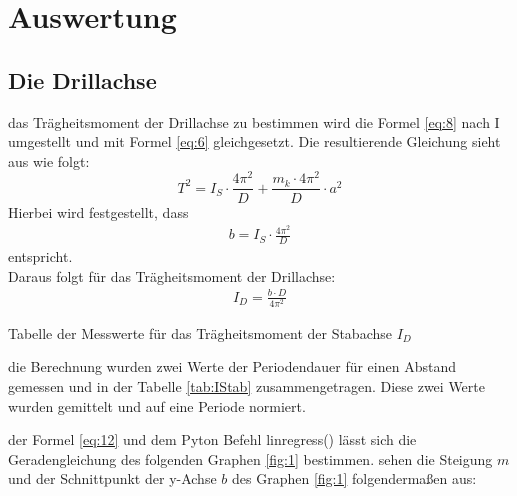 \section{Auswertung}\justifying

\subsection{Die Drillachse}\justifying %

\justifying das Trägheitsmoment der Drillachse zu bestimmen wird die Formel \eqref{eq:8} nach I umgestellt und mit Formel %
\eqref{eq:6} gleichgesetzt. Die resultierende Gleichung sieht aus wie folgt:
\begin{equation}
T^2 = I_S \cdot \frac{4\pi^2}{D} + \frac{m_k \cdot 4\pi^2}{D} \cdot a^2\label{eq:11}
\end{equation} 
Hierbei wird festgestellt, dass
\begin{align}
    b=I_S \cdot \frac{4\pi^2}{D} \label{eq:12}
\end{align}
entspricht.\\
Daraus folgt für das Trägheitsmoment der Drillachse:
\begin{align}
    I_D = \frac{b \cdot D}{4 \pi^2} \label{eq:13}
\end{align}

\begin{table}[H]
    \centering
    
    \caption{Tabelle der Messwerte für das Trägheitsmoment der Stabachse $I_D$}
    \label{tab:IStab}
\end{table}

 die Berechnung wurden zwei Werte der Periodendauer für einen Abstand gemessen und in der Tabelle \ref{tab:IStab}
zusammengetragen. Diese zwei Werte wurden gemittelt und auf eine Periode normiert.

\justifying der Formel \eqref{eq:12} und dem Pyton Befehl linregress() \cite{numpy} lässt sich die Geradengleichung
des folgenden Graphen \ref{fig:1} bestimmen. 
\justifying sehen die Steigung $m$ und der Schnittpunkt der y-Achse $b$ des Graphen \ref{fig:1} folgendermaßen aus:

